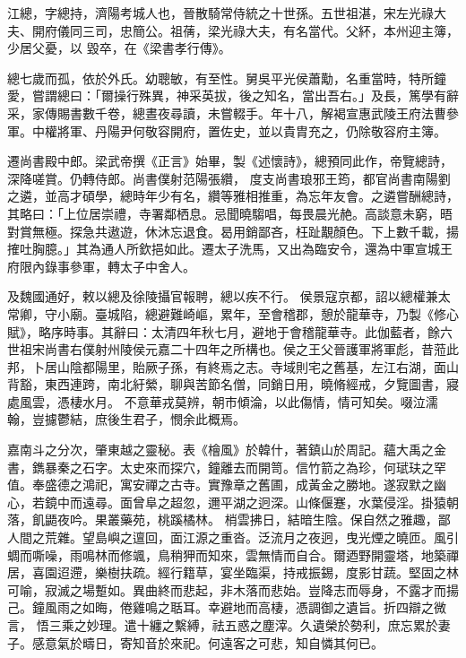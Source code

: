 
\begin{pinyinscope}

 江總，字總持，濟陽考城人也，晉散騎常侍統之十世孫。五世祖湛，宋左光祿大夫、開府儀同三司，忠簡公。祖蒨，梁光祿大夫，有名當代。父紑，本州迎主簿，少居父憂，以
 毀卒，在《梁書孝行傳》。



 總七歲而孤，依於外氏。幼聰敏，有至性。舅吳平光侯蕭勱，名重當時，特所鐘愛，嘗謂總曰：「爾操行殊異，神采英拔，後之知名，當出吾右。」及長，篤學有辭采，家傳賜書數千卷，總晝夜尋讀，未嘗輟手。年十八，解褐宣惠武陵王府法曹參軍。中權將軍、丹陽尹何敬容開府，置佐史，並以貴胄充之，仍除敬容府主簿。



 遷尚書殿中郎。梁武帝撰《正言》始畢，製《述懷詩》，總預同此作，帝覽總詩，深降嗟賞。仍轉侍郎。尚書僕射范陽張纘，
 度支尚書琅邪王筠，都官尚書南陽劉之遴，並高才碩學，總時年少有名，纘等雅相推重，為忘年友會。之遴嘗酬總詩，其略曰：「上位居崇禮，寺署鄰栖息。忌聞曉騶唱，每畏晨光赩。高談意未窮，晤對賞無極。探急共遨遊，休沐忘退食。曷用銷鄙吝，枉趾覯顏色。下上數千載，揚搉吐胸臆。」其為通人所欽挹如此。遷太子洗馬，又出為臨安令，還為中軍宣城王府限內錄事參軍，轉太子中舍人。



 及魏國通好，敕以總及徐陵攝官報聘，總以疾不行。
 侯景寇京都，詔以總權兼太常卿，守小廟。臺城陷，總避難崎嶇，累年，至會稽郡，憩於龍華寺，乃製《修心賦》，略序時事。其辭曰：太清四年秋七月，避地于會稽龍華寺。此伽藍者，餘六世祖宋尚書右僕射州陵侯元嘉二十四年之所構也。侯之王父晉護軍將軍彪，昔蒞此邦，卜居山陰都陽里，貽厥子孫，有終焉之志。寺域則宅之舊基，左江右湖，面山背豁，東西連跨，南北紆縈，聊與苦節名僧，同銷日用，曉脩經戒，夕覽圖書，寢處風雲，憑棲水月。
 不意華戎莫辨，朝市傾淪，以此傷情，情可知矣。啜泣濡翰，豈攄鬱結，庶後生君子，憫余此概焉。



 嘉南斗之分次，肇東越之靈秘。表《檜風》於韓什，著鎮山於周記。蘊大禹之金書，鐫暴秦之石字。太史來而探穴，鐘離去而開笥。信竹箭之為珍，何珷玞之罕值。奉盛德之鴻祀，寓安禪之古寺。實豫章之舊圃，成黃金之勝地。遂寂默之幽心，若鏡中而遠尋。面曾阜之超忽，邇平湖之迥深。山條偃蹇，水葉侵淫。掛猿朝落，飢鼯夜吟。果叢藥苑，桃蹊橘林。
 梢雲拂日，結暗生陰。保自然之雅趣，鄙人間之荒雜。望島嶼之邅回，面江源之重沓。泛流月之夜迥，曳光煙之曉匝。風引蜩而嘶噪，雨鳴林而修颯，鳥稍狎而知來，雲無情而自合。爾迺野開靈塔，地築禪居，喜園迢遰，樂樹扶疏。經行籍草，宴坐臨渠，持戒振錫，度影甘蔬。堅固之林可喻，寂滅之場蹔如。異曲終而悲起，非木落而悲始。豈降志而辱身，不露才而揚己。鐘風雨之如晦，倦雞鳴之聒耳。幸避地而高棲，憑調御之遺旨。折四辯之微言，
 悟三乘之妙理。遣十纏之繫縛，祛五惑之塵滓。久遺榮於勢利，庶忘累於妻子。感意氣於疇日，寄知音於來祀。何遠客之可悲，知自憐其何已。




\end{pinyinscope}
